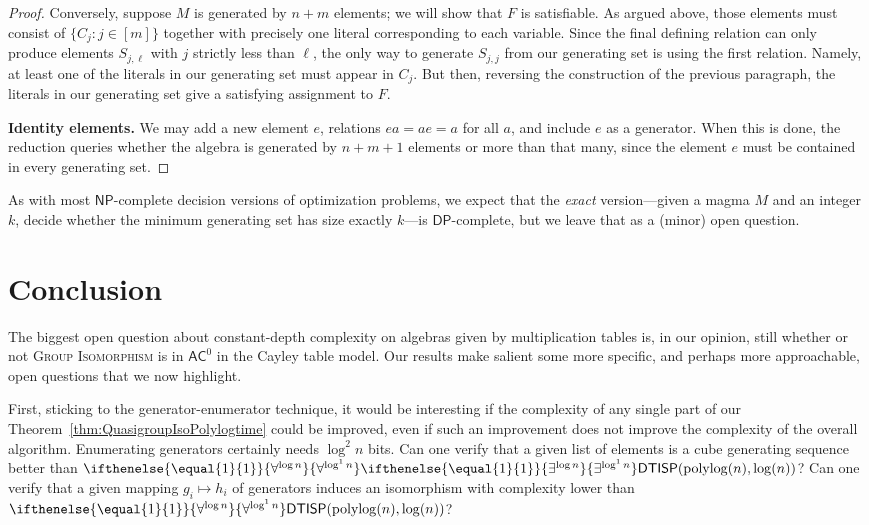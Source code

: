 \documentclass{theoretics}
\newcommand{\algprobm}[1]{\textsc{#1}\xspace}
\newcommand{\betacc}[1]{\ifthenelse{\equal{#1}{1}}{\exists^{\log n}}{\exists^{\log^{#1}n}}} %
\newcommand{\alphacc}[1]{\ifthenelse{\equal{#1}{1}}{\forall^{\log n}}{\forall^{\log^{#1}n}}} %
\newcommand*{\ComplexityClass}[1]{\ensuremath{\mathsf{#1}}\xspace}
\newcommand{\DTISP}{\ComplexityClass{DTISP}}
\newcommand{\DTISPpll}{\ensuremath{\DTISP(\mathrm{polylog}(n),\mathrm{log}(n))}\xspace}
\begin{document}
\begin{proof}
Conversely, suppose $M$ is generated by $n+m$ elements; we will show that $F$ is satisfiable. As argued above, those elements must consist of $\{C_j : j \in [m]\}$ together with precisely one literal corresponding to each variable. Since the final defining relation can only produce elements $S_{j,\ell}$ with $j$ strictly less than $\ell$, the only way to generate $S_{j,j}$ from our generating set is using the first relation. Namely, at least one of the literals in our generating set must appear in $C_j$. But then, reversing the construction of the previous paragraph, the literals in our generating set give a satisfying assignment to $F$. 

\textbf{Identity elements.} We may add a new element $e$, relations $ea = ae = a$ for all $a$, and include $e$ as a generator. When this is done, the reduction queries whether the algebra is generated by $n+m+1$ elements or more than that many, since the element $e$ must be contained in every generating set.
\end{proof}

As with most $\mathsf{NP}$-complete decision versions of optimization problems, we expect that the \emph{exact} version---given a magma $M$ and an integer $k$, decide whether the minimum generating set has size exactly $k$---is $\mathsf{DP}$-complete, but we leave that as a (minor) open question.

\section{Conclusion} \label{sec:conclusion}
The biggest open question about constant-depth complexity on algebras given by multiplication tables is, in our opinion, still whether or not \algprobm{Group Isomorphism} is in $\mathsf{AC}^0$ in the Cayley table model. 
Our results make salient some more specific, and perhaps more approachable, open questions that we now highlight. 

First, sticking to the generator-enumerator technique, it would be interesting if the complexity of any single part of our Theorem~\ref{thm:QuasigroupIsoPolylogtime} could be improved, even if such an improvement does not improve the complexity of the overall algorithm. Enumerating generators certainly needs $\log^2 n$ bits. Can one verify that a given list of elements is a cube generating sequence better than $\alphacc{1} \betacc{1}\DTISPpll$? Can one verify that a given mapping $g_i \mapsto h_i$ of generators induces an isomorphism with complexity lower than $\alphacc{1}\DTISPpll$? 
\end{document}
